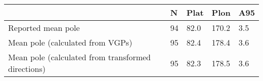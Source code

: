 \begin{tabular}{lllll}
\toprule
{} &   N &  Plat &   Plon &  A95 \\
\midrule
Reported mean pole                                 &  94 &  82.0 &  170.2 &  3.5 \\
Mean pole (calculated from VGPs)                   &  95 &  82.4 &  178.4 &  3.6 \\
Mean pole (calculated from transformed directions) &  95 &  82.3 &  178.5 &  3.6 \\
\bottomrule
\end{tabular}
